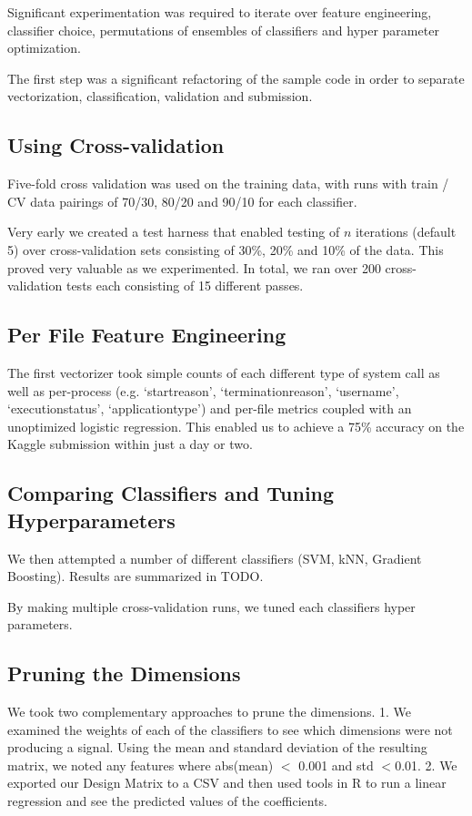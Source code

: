 \documentclass[11pt, oneside]{article}   	%
\begin{document}
Significant experimentation was required to iterate over feature engineering, classifier choice, permutations of ensembles of classifiers and hyper parameter optimization.

The first step was a significant refactoring of the sample code in order to separate vectorization, classification, validation and submission.

\subsection*{Using Cross-validation}
Five-fold cross validation was used on the training data, with runs with train / CV data pairings of 70/30, 80/20 and 90/10 for each classifier.

Very early we created a test harness that enabled testing of $n$ iterations (default 5) over cross-validation sets consisting of 30\%, 20\% and 10\% of the data. This proved very valuable as we experimented. In total, we ran over 200 cross-validation tests each consisting of 15 different passes.

\subsection*{Per File Feature Engineering}

The first vectorizer took simple counts of each different type of system call as well as per-process (e.g. `startreason', `terminationreason', `username', `executionstatus', `applicationtype') and per-file metrics coupled with an unoptimized logistic regression. This enabled us to achieve a 75\% accuracy on the Kaggle submission within just a day or two.

\subsection*{Comparing Classifiers and Tuning Hyperparameters}

We then attempted a number of different classifiers (SVM, kNN, Gradient Boosting). Results are summarized in TODO.

By making multiple cross-validation runs, we tuned each classifiers hyper parameters.

\subsection*{Pruning the Dimensions}

We took two complementary approaches to prune the dimensions.
1. We examined the weights of each of the classifiers to see which dimensions were not producing a signal. Using the mean and standard deviation of the resulting matrix, we noted any features where abs(mean) $<$ 0.001 and std $< $0.01.
2. We exported our Design Matrix to a CSV and then used tools in R to run a linear regression and see the predicted values of the coefficients. 
\end{document}
